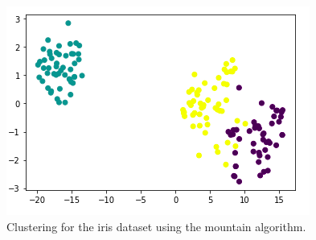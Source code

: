 \documentclass[conference]{IEEEtran}
\begin{document}
\begin{figure}[ht]
    \centering
    \includegraphics[scale = 0.45]{figures/iris/mountain.png}
    \caption{Clustering for the iris dataset using the mountain algorithm.}
    \label{fig:mon-iris}
\end{figure}
\end{document}
